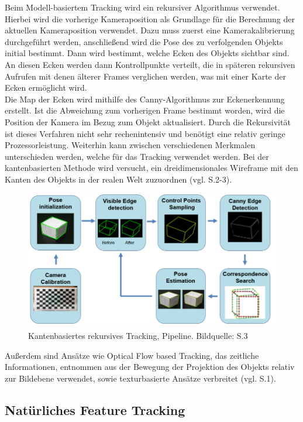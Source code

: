 Beim Modell-basiertem Tracking wird ein rekursiver Algorithmus verwendet. Hierbei wird die vorherige Kameraposition als Grundlage für die Berechnung der aktuellen Kameraposition verwendet. Dazu muss zuerst eine Kamerakalibrierung durchgeführt werden, anschließend wird die Pose des zu verfolgenden Objekts initial bestimmt. Dann wird bestimmt, welche Ecken des Objekts sichtbar sind. An diesen Ecken werden dann Kontrollpunkte verteilt, die in späteren rekursiven Aufrufen mit denen älterer Frames verglichen werden, was mit einer Karte der Ecken ermöglicht wird. \\ Die Map der Ecken wird mithilfe des Canny-Algorithmus zur Eckenerkennung erstellt. Ist die Abweichung zum vorherigen Frame bestimmt worden, wird die Position der Kamera im Bezug zum Objekt aktualisiert. Durch die Rekursivität ist dieses Verfahren nicht sehr rechenintensiv und benötigt eine relativ geringe Prozessorleistung. Weiterhin kann zwischen verschiedenen Merkmalen unterschieden werden, welche für das Tracking verwendet werden. Bei der kantenbasierten Methode wird versucht, ein dreidimensionales Wireframe mit den Kanten des Objekts in der realen Welt zuzuordnen (vgl. \cite{model_based} S.2-3).

\begin{figure}[H]
	\centering
	\includegraphics[scale=0.75]{wire.png}
	\caption{Kantenbasiertes rekursives Tracking, Pipeline. Bildquelle: \cite{model_based} S.3}
\end{figure} 

Außerdem sind Ansätze wie \glqq Optical Flow based Tracking\grqq{}, das zeitliche Informationen, entnommen aus der Bewegung der Projektion des Objekts relativ zur Bildebene verwendet, sowie texturbasierte Ansätze verbreitet (vgl. \cite{model_based} S.1).

\subsection{Natürliches Feature Tracking}

